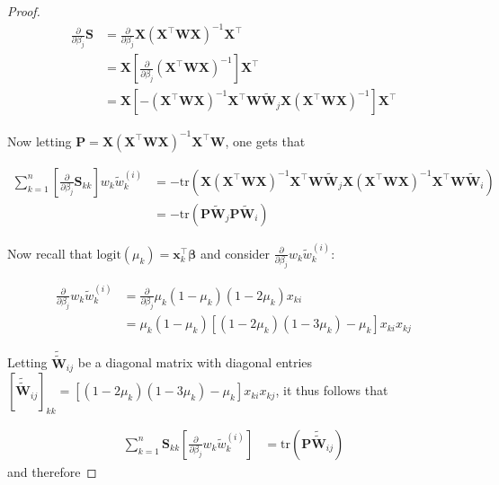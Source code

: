 \documentclass[11pt, a4paper]{article}
\newcommand*{\bb}{\boldsymbol}
\theoremstyle{example} \newtheorem{example}{Example}[section]
\theoremstyle{theorem} \newtheorem{theorem}{Theorem}[section]
\theoremstyle{theorem }\newtheorem{proposition}{Proposition}[section]
\theoremstyle{theorem }\newtheorem{corollary}{Corollary}[section]
\def\\bbeta{\bb{\\bbeta}}
\begin{document}
\begin{proof}
\begin{equation}
\begin{aligned}
\frac{\partial}{\partial \beta_j}\bb S &= \frac{\partial}{\partial \beta_j}\bb X(\bb X^\top\bb W\bb X)^{-1}\bb X^\top \\ 
& = \bb X \left[\frac{\partial}{\partial\beta_j}(\bb X^\top\bb W\bb X)^{-1} \right]\bb X^\top\\ 
& = \bb X\left[-(\bb X^\top\bb W\bb X)^{-1}  \bb X^\top\bb W\widetilde{\bb W}_j\bb X(\bb X^\top\bb W\bb X)^{-1}\right]\bb X^\top
\end{aligned}
\end{equation}

Now letting $\bb P= \bb X(\bb X^\top\bb W\bb X)^{-1}\bb X^\top\bb W$, one gets that 

\begin{equation}
\begin{aligned}
\sum_{k=1}^{n}\left[\frac{\partial}{\partial \beta_j}\bb S_{kk}\right]w_k \widetilde{w}^{(i)}_k &= -\textrm{tr}\left(\bb X(\bb X^\top\bb W\bb X)^{-1}  \bb X^\top\bb W\widetilde{\bb W}_j\bb X(\bb X^\top\bb W\bb X)^{-1}\bb X^\top\bb W\widetilde{\bb W}_i \right) \\ 
&= - \textrm{tr}\left(\bb P\widetilde{\bb W}_j \bb P\widetilde{\bb W}_i \right)
\end{aligned}
\end{equation}

Now recall that $\textrm{logit}(\mu_k) = \bb x_k^\top \bb \beta$ and consider $\frac{\partial}{\partial \beta_j}w_k \widetilde{w}^{(i)}_k$: 

\begin{equation}
\begin{aligned}
\frac{\partial}{\partial \beta_j}w_k \widetilde{w}^{(i)}_k &= \frac{\partial}{\partial \beta_j}\mu_k(1-\mu_k)(1-2\mu_k)x_{ki} \\ 
&=\mu_k(1-\mu_k)\left[(1-2\mu_k)(1-3\mu_k)-\mu_k \right] x_{ki}x_{kj}
\end{aligned}
\end{equation}

Letting $\widetilde{\widetilde{\bb W}}_{ij}$ be a diagonal matrix with diagonal entries $[\widetilde{\widetilde{\bb W}}_{ij}]_{kk} = \left[(1-2\mu_k)(1-3\mu_k)-\mu_k \right] x_{ki}x_{kj}$, it thus follows that 

\begin{equation}
\begin{aligned}
\sum_{k=1}^{n}\bb S_{kk}\left[\frac{\partial}{\partial \beta_j}w_k \widetilde{w}^{(i)}_k\right] &= \textrm{tr}\left(\bb P\widetilde{\widetilde{\bb W}}_{ij} \right)
\end{aligned}
\end{equation}
and therefore 


\end{proof}
\end{document}
